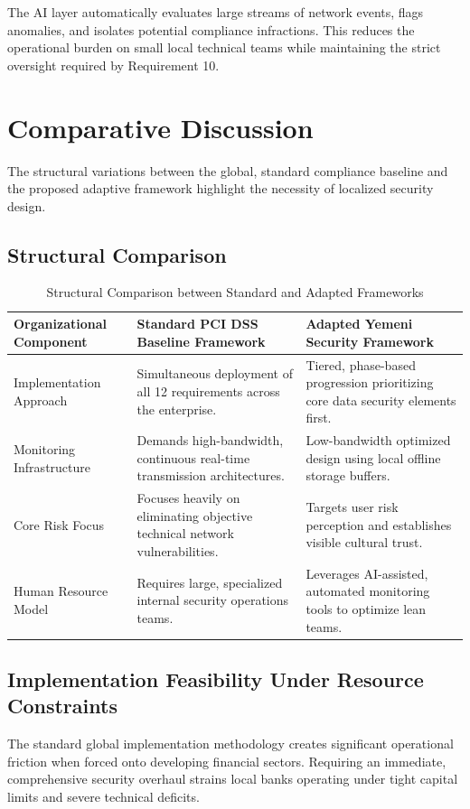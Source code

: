 \documentclass[12pt,a4paper,oneside]{report}
\begin{document}
	The AI layer automatically evaluates large streams of network events, flags anomalies, and isolates potential compliance infractions. This reduces the operational burden on small local technical teams while maintaining the strict oversight required by Requirement 10.
	
	\section{Comparative Discussion}
	The structural variations between the global, standard compliance baseline and the proposed adaptive framework highlight the necessity of localized security design.
	
	\subsection{Structural Comparison}
	
	\begin{table}[h!]
		\centering
		\caption{Structural Comparison between Standard and Adapted Frameworks}
		\label{tab:framework_comparison}
		\begin{tabular}{p{4cm} p{5.5cm} p{5.5cm}}
			\toprule
			\textbf{Organizational Component} & \textbf{Standard PCI DSS Baseline Framework} & \textbf{Adapted Yemeni Security Framework} \\
			\midrule
			Implementation Approach & Simultaneous deployment of all 12 requirements across the enterprise. & Tiered, phase-based progression prioritizing core data security elements first. \\
			\midrule
			Monitoring Infrastructure & Demands high-bandwidth, continuous real-time transmission architectures. & Low-bandwidth optimized design using local offline storage buffers. \\
			\midrule
			Core Risk Focus & Focuses heavily on eliminating objective technical network vulnerabilities. & Targets user risk perception and establishes visible cultural trust. \\
			\midrule
			Human Resource Model & Requires large, specialized internal security operations teams. & Leverages AI-assisted, automated monitoring tools to optimize lean teams. \\
			\bottomrule
		\end{tabular}
	\end{table}
	
	\subsection{Implementation Feasibility Under Resource Constraints}
	The standard global implementation methodology creates significant operational friction when forced onto developing financial sectors. Requiring an immediate, comprehensive security overhaul strains local banks operating under tight capital limits and severe technical deficits. 
	
\end{document}
